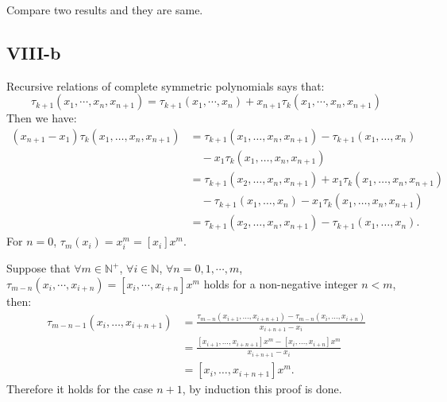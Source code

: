 \documentclass[a4paper]{article}
\begin{document}
Compare two results and they are same.

\subsection*{VIII-b}
Recursive relations of complete symmetric polynomials says that:
$$
\tau_{k+1}(x_1,\cdots,x_n,x_{n+1})
= \tau_{k+1}(x_1,\cdots,x_n) + x_{n+1}\tau_k(x_1,\cdots,x_n,x_{n+1})
$$
Then we have:
\begin{align*}
  (x_{n+1} - x_1) \tau_k (x_1, \dots, x_n, x_{n+1}) 
  &= \tau_{k+1}(x_1, \dots, x_n, x_{n+1}) - \tau_{k+1}(x_1, \dots, x_n) \\
  &\quad - x_1 \tau_k(x_1, \dots, x_n, x_{n+1}) \\
  &= \tau_{k+1}(x_2, \dots, x_n, x_{n+1}) + x_1 \tau_k(x_1, \dots, x_n, x_{n+1}) \\
  &\quad - \tau_{k+1}(x_1, \dots, x_n) - x_1 \tau_k(x_1, \dots, x_n, x_{n+1}) \\
  &= \tau_{k+1}(x_2, \dots, x_n, x_{n+1}) - \tau_{k+1}(x_1, \dots, x_n).
\end{align*}
For $n=0$, $\tau_m(x_i) = x_i^m = [x_i]x^m$.

Suppose that $\forall m \in \mathbb{N}^+$, $\forall i \in \mathbb{N}$, $\forall n = 0,1,\cdots,m$,
$\tau_{m-n}(x_i,\cdots,x_{i+n}) = [x_i,\cdots,x_{i+n}]x^m$ holds for a non-negative integer $n<m$, then:
\begin{align*}
  \tau_{m-n-1}(x_i, \dots, x_{i+n+1}) 
  &= \frac{\tau_{m-n}(x_{i+1}, \dots, x_{i+n+1}) - \tau_{m-n}(x_i, \dots, x_{i+n})}{x_{i+n+1} - x_i} \\
  &= \frac{[x_{i+1}, \dots, x_{i+n+1}] x^m - [x_i, \dots, x_{i+n}] x^m}{x_{i+n+1} - x_i} \\
  &= [x_i, \dots, x_{i+n+1}] x^m.
\end{align*}
Therefore it holds for the case $n+1$, by induction this proof is done.
\end{document}
